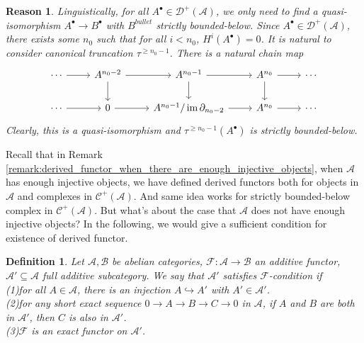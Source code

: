 \documentclass{ctexart}
\newtheorem{definition}{Definition}[section]
\newtheorem{reason}{Reason}[section]
\newcommand{\im}{\operatorname{im}}
\begin{document}
\begin{reason}
    Linguistically, for all $A^{\bullet}\in \mathcal{D}^{+}(\mathscr{A})$, 
    we only need to find a quasi-isomorphism $A^{\bullet} \rightarrow B^{\bullet}$ with $B^{bullet}$ strictly bounded-below.
    Since $A^{\bullet}\in \mathcal{D}^{+}(\mathscr{A})$, there exists some $n_{0}$ such that for all $i < n_{0}$, $H^{i}(A^{\bullet}) = 0$.
    It is natural to consider canonical truncation $\tau^{\ge n_{0} - 1}$.
    There is a natural chain map
    \begin{equation}
        \begin{tikzcd}
            \cdots \arrow[r] &
            A^{n_{0} - 2} \arrow[r] \arrow[d] &
            A^{n_{0} - 1} \arrow[r] \arrow[d] &
            A^{n_{0}} \arrow[r] \arrow[d] &
            \cdots \\
            \cdots \arrow[r] &
            0 \arrow[r] &
            A^{n_{0} - 1}/\im \partial_{n_{0} - 2} \arrow[r] &
            A^{n_{0}} \arrow[r] &
            \cdots
        \end{tikzcd}
    \end{equation}
    Clearly, this is a quasi-isomorphism and $\tau^{\ge n_{0} - 1}(A^{\bullet})$ is strictly bounded-below.
\end{reason}
Recall that in Remark \ref{remark:derived_functor_when_there_are_enough_injective_objects},
when $\mathscr{A}$ has enough injective objects,
we have defined derived functors both for objects in $\mathscr{A}$ and complexes in $\mathcal{C}^{+}(\mathscr{A})$.
And same idea works for strictly bounded-below complex in $\mathcal{C}^{+}(\mathscr{A})$. 
But what's about the case that $\mathscr{A}$ does not have enough injective objects?
In the following, we would give a sufficient condition for existence of derived functor.
\begin{definition}
    Let $\mathscr{A}, \mathscr{B}$ be abelian categories, $\mathcal{F}: \mathscr{A} \rightarrow \mathscr{B}$ an additive functor, $\mathscr{A}' \subseteq \mathscr{A}$ full additive subcategory.
    We say that $\mathscr{A}'$ satisfies $\mathcal{F}$-condition if \\
    (1)for all $A\in \mathscr{A}$, there is an injection $A \hookrightarrow A'$ with $A'\in \mathscr{A}'$. \\
    (2)for any short exact sequence $0 \rightarrow A \rightarrow B \rightarrow C \rightarrow 0$ in $\mathscr{A}$,
    if $A$ and $B$ are both in $\mathscr{A}'$, then $C$ is also in $\mathscr{A}'$. \\
    (3)$\mathcal{F}$ is an exact functor on $\mathscr{A}'$.
\end{definition}
\end{document}
